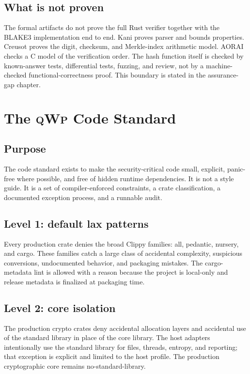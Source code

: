 \documentclass[11pt,a4paper]{article}
\newcommand{\qwp}{\textsc{qWp}}
\begin{document}
\subsection{What is not proven}

The formal artifacts do not prove the full Rust verifier together with the
BLAKE3 implementation end to end. Kani proves parser and bounds properties.
Creusot proves the digit, checksum, and Merkle-index arithmetic model. AORAI
checks a C model of the verification order. The hash function itself is checked
by known-answer tests, differential tests, fuzzing, and review, not by a
machine-checked functional-correctness proof. This boundary is stated in the
assurance-gap chapter.

\section{The \qwp{} Code Standard}

\subsection{Purpose}

The code standard exists to make the security-critical code small, explicit,
panic-free where possible, and free of hidden runtime dependencies. It is not a
style guide. It is a set of compiler-enforced constraints, a crate
classification, a documented exception process, and a runnable audit.

\subsection{Level 1: default lax patterns}

Every production crate denies the broad Clippy families: all, pedantic,
nursery, and cargo. These families catch a large class of accidental
complexity, suspicious conversions, undocumented behavior, and packaging
mistakes. The cargo-metadata lint is allowed with a reason because the project
is local-only and release metadata is finalized at packaging time.

\subsection{Level 2: core isolation}

The production crypto crates deny accidental allocation layers and accidental
use of the standard library in place of the core library. The host adapters
intentionally use the standard library for files, threads, entropy, and
reporting; that exception is explicit and limited to the host profile. The
production cryptographic core remains no-standard-library.
\end{document}
